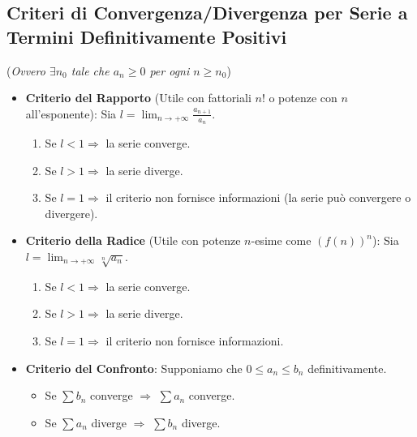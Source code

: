 \documentclass[10pt, a4paper]{article}
\begin{document}
    \subsection{Criteri di Convergenza/Divergenza per Serie a Termini Definitivamente Positivi}
        (\textit{Ovvero $\exists n_0$ tale che $a_n \geq 0$ per ogni $n \geq n_0$})
        \begin{itemize}
            \item \textbf{Criterio del Rapporto} (Utile con fattoriali $n!$ o potenze con $n$ all'esponente):
            Sia $l = \lim_{n\rightarrow +\infty}\frac{a_{n+1}}{a_n}$.
            \begin{enumerate}
                \item Se $l<1 \Rightarrow$ la serie converge.
                \item Se $l>1 \Rightarrow$ la serie diverge.
                \item Se $l=1 \Rightarrow$ il criterio non fornisce informazioni (la serie può convergere o divergere).
            \end{enumerate}

            \item \textbf{Criterio della Radice} (Utile con potenze $n$-esime come $(f(n))^n$):
            Sia $l = \lim_{n\rightarrow+\infty}\sqrt[n]{a_n}$.
            \begin{enumerate}
                \item Se $l<1 \Rightarrow$ la serie converge.
                \item Se $l>1 \Rightarrow$ la serie diverge.
                \item Se $l=1 \Rightarrow$ il criterio non fornisce informazioni.
            \end{enumerate}

            \item \textbf{Criterio del Confronto}: Supponiamo che $0 \leq a_n \leq b_n$ definitivamente.
            \begin{itemize}
                \item Se $\sum b_n$ converge $\Rightarrow$ $\sum a_n$ converge.
                \item Se $\sum a_n$ diverge $\Rightarrow$ $\sum b_n$ diverge.
            \end{itemize}


\end{itemize}
\end{document}
